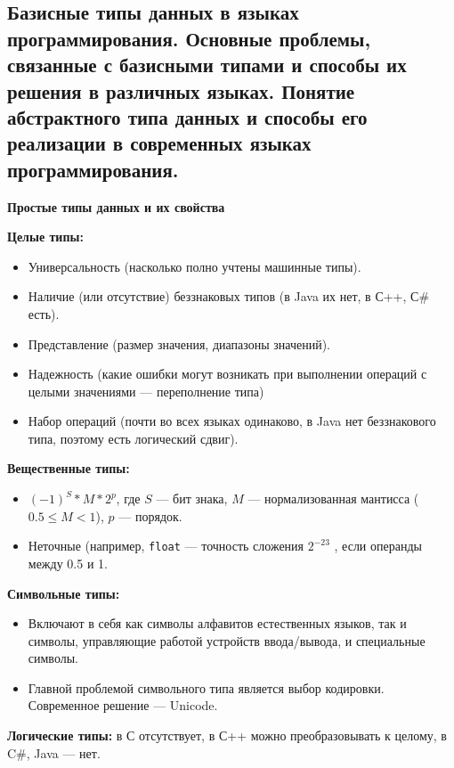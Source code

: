 \subsection{Базисные типы данных в языках программирования. Основные проблемы, связанные с базисными типами и способы их решения в различных языках. Понятие абстрактного типа данных и способы его реализации в современных языках программирования.}

\textbf{Простые типы данных и их свойства}

\textbf{Целые типы:}
\begin{itemize}
    \item Универсальность (насколько полно учтены машинные типы).
    \item Наличие (или отсутствие) беззнаковых типов (в Java их нет, в С++, С\# есть).
    \item Представление (размер значения, диапазоны значений).
    \item Надежность (какие ошибки могут возникать при выполнении операций с целыми значениями --- переполнение типа)
    \item Набор операций (почти во всех языках одинаково, в Java нет беззнакового типа, поэтому есть логический сдвиг).
\end{itemize}

\textbf{Вещественные типы:}
\begin{itemize}
    \item $(-1)^S \ast M \ast 2^p$, где $S$ --- бит знака, $M$ --- нормализованная мантисса ($0.5 \leq M < 1$), $p$ --- порядок.
    \item Неточные (например, \texttt{float} --- точность сложения $2^{-23}$ , если операнды между 0.5 и 1.
\end{itemize}

\textbf{Символьные типы:}
\begin{itemize}
    \item Включают в себя как символы алфавитов естественных языков, так и символы, управляющие работой устройств ввода/вывода, и специальные символы.
    \item Главной проблемой символьного типа является выбор кодировки.
    Современное решение --- Unicode.
\end{itemize}

\textbf{Логические типы:} в С отсутствует, в С++ можно преобразовывать к целому, в C\#, Java --- нет.

